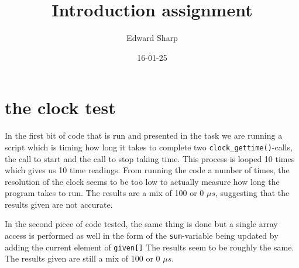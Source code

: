 \documentclass[a4paper,11pt]{article}
\begin{document}
\title{
    \textbf{Introduction assignment}
}
\author{Edward Sharp}
\date{16-01-25}

\maketitle

\section{the clock test}
    In the first bit of code that is run and presented in the task we are running a script
    which is timing how long it takes to complete two {\tt clock\_gettime()}-calls,
    the call to start and the call to stop taking time. This process is looped 10 times which
    gives us 10 time readings.
    From running the code a number of times, the resolution of the clock seems to be too low to
    actually measure how long the program takes to run. The results are a mix of 100 or 0 $\mu s$,
    suggesting that the results given are not accurate.


    In the second piece of code tested, the same thing is done but a single array access is performed
    as well in the form of the {\tt sum}-variable being updated by adding the current element of {\tt given[]}
    The results seem to be roughly the same. The results given are still a mix of 100 or 0 $\mu s$.
\end{document}
